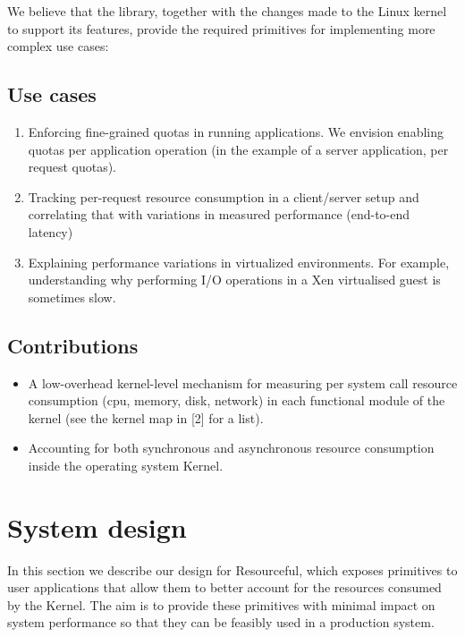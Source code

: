 \documentclass[12pt]{article}
\begin{document}
We believe that the library, together with the changes made to the Linux kernel to support its features, provide the required primitives for implementing more complex use cases:

\subsection{Use cases}
\begin{enumerate}
\item Enforcing fine-grained quotas in running applications. We envision enabling quotas per application operation (in the example of a server application, per request quotas).
\item Tracking per-request resource consumption in a client/server setup and correlating that with variations in measured performance (end-to-end latency)
\item Explaining performance variations in virtualized environments. For example, understanding why performing I/O operations in a Xen virtualised guest is sometimes slow.
\end{enumerate}


\subsection{Contributions}
\begin{itemize}
\item A low-overhead kernel-level mechanism for measuring per system call resource consumption (cpu, memory, disk, network) in each functional module of the kernel (see the kernel map in [2] for a list).
\item Accounting for both synchronous and asynchronous resource consumption inside the operating system Kernel.
\end{itemize}


\section{System design}
In this section we describe our design for Resourceful, which exposes primitives to user applications that allow them to better account for the resources consumed by the Kernel. 
The aim is to provide these primitives with minimal impact on system performance so that they can be feasibly used in a production system.
\end{document}
